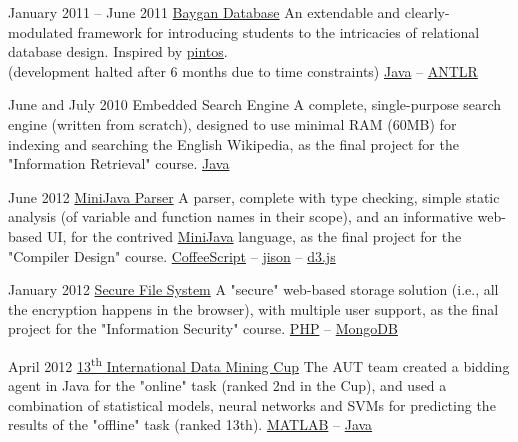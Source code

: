 \documentclass{tccv}
\begin{document}
{{\begin{project_list}
\vspace{-3pt}


\item{January 2011 -- June 2011}
	 {}
	 {\href{https://github.com/baygan/Baygan}{Baygan Database}}
	 {An extendable and clearly-modulated framework for introducing students to the intricacies of relational database design. Inspired by \href{http://www.stanford.edu/class/cs140/projects/pintos/pintos.html}{pintos}.\\
(development halted after 6 months due to time constraints)}
	 {
	 	\href{http://www.oracle.com/technetwork/java/}{Java} -- 
		\href{http://www.antlr.org}{ANTLR}
	 }
	 

\vspace{5pt}
	 
	 
\item{June and July 2010}
	 {}
	 {Embedded Search Engine}
	 {A complete, single-purpose search engine (written from scratch), designed to use minimal RAM (60MB) for indexing and searching the English Wikipedia, as the final project for the "Information Retrieval" course.}
	 {
		 \href{http://www.oracle.com/technetwork/java/}{Java}
	 }



\item{June 2012}
	 {}
	 {\href{https://github.com/pooriaazimi/Mini-Java}{MiniJava Parser}}
	 {A parser, complete with type checking, simple static analysis (of variable and function names in their scope), and an informative web-based UI, for the contrived \href{http://www.cambridge.org/resources/052182060X/MCIIJ2e/grammar.htm}{MiniJava} language, as the final project for the "Compiler Design" course.}
	 {
		 \href{http://coffeescript.org}{CoffeeScript} -- 
		 \href{http://zaach.github.io/jison/}{jison} -- 
		 \href{http://d3js.org}{d3.js}
	 }



\item{January 2012}
	 {}
	 {\href{https://github.com/pooriaazimi/secure_file_system}{Secure File System}}
	 {A "secure" web-based storage solution (i.e., all the encryption happens in the browser), with multiple user support, as the final project for the "Information Security" course.}
	 {
		 \href{http://php.net}{PHP} -- 
		 \href{http://www.mongodb.org}{MongoDB}
	 }



\item{April 2012}
	 {}
	 {\href{http://www.data-mining-cup.de/en/review/dmc-2012/}{13\textsuperscript{th} International Data Mining Cup}}
	 {The AUT team created a bidding agent in Java for the "online" task (ranked 2nd in the Cup), and used a combination of statistical models, neural networks and SVMs for predicting the results of the "offline" task (ranked 13th).}
	 {
	 	\href{http://www.mathworks.com/products/matlab/}{MATLAB} -- 
	 	\href{http://www.oracle.com/technetwork/java/}{Java}
	 }




\end{project_list}}}
\end{document}
